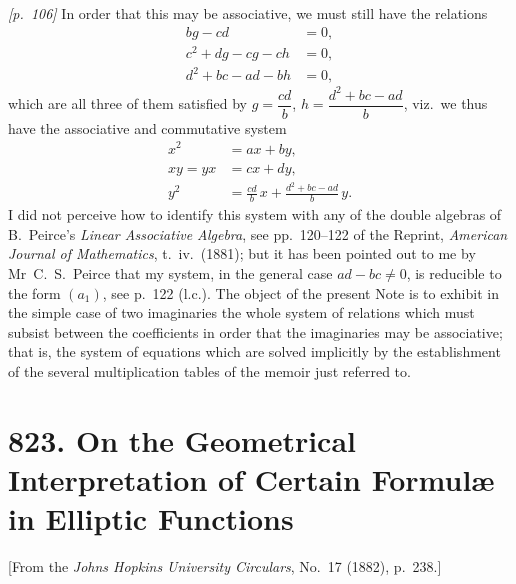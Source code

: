 \documentclass[11pt,a4paper]{article}
\theoremstyle{plain}
\theoremstyle{definition}
\theoremstyle{remark}
\begin{document}
\noindent\textit{[p.~106]} In order that this may be associative, we must still have the relations
\begin{align*}
bg - cd &= 0,\\
c^2 + dg - cg - ch &= 0,\\
d^2 + bc - ad - bh &= 0,
\end{align*}
which are all three of them satisfied by $g = \dfrac{cd}{b}$, $h = \dfrac{d^2 + bc - ad}{b}$, viz.\ we thus have the associative and commutative system
\begin{align*}
x^2 &= ax + by,\\
xy = yx &= cx + dy,\\
y^2 &= \frac{cd}{b}\,x + \frac{d^2 + bc - ad}{b}\,y.
\end{align*}
I did not perceive how to identify this system with any of the double algebras of B.~Peirce's \textit{Linear Associative Algebra}, see pp.~120--122 of the Reprint, \textit{American Journal of Mathematics}, t.~iv.\ (1881); but it has been pointed out to me by Mr~C.~S.~Peirce that my system, in the general case $ad - bc \neq 0$, is reducible to the form $(a_1)$, see p.~122 (l.c.). The object of the present Note is to exhibit in the simple case of two imaginaries the whole system of relations which must subsist between the coefficients in order that the imaginaries may be associative; that is, the system of equations which are solved implicitly by the establishment of the several multiplication tables of the memoir just referred to.

\bigskip

\newpage
\section*{823. On the Geometrical Interpretation of Certain Formul\ae{} in Elliptic Functions}

\begin{center}
\small[From the \textit{Johns Hopkins University Circulars}, No.~17 (1882), p.~238.]
\end{center}

\bigskip
\end{document}
